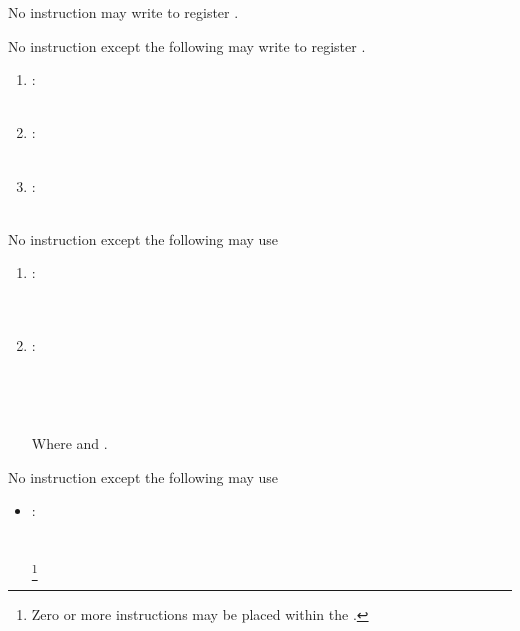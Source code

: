 
\specitem
No instruction may write to register \rbase.

\specitem
No instruction except the following may write to register \rsp.

\begin{enumerate}
    \item
        : \\
         \\
    \item
        : \\
         \\
    \item
        : \\
         \\
\end{enumerate}


\specitem
\label{specitem:x64_jmpq}
No instruction except the following may use 

\begin{enumerate}
    \item
        : \\
         \\
         \\
    \item
        : \\
         \\
         \\
         \\ \\
        Where  and .
\end{enumerate}

\specitem
No instruction except the following may use 

\begin{itemize}
    \item
        : \\
         \\
         \\
        \footnote{Zero or more  instructions may be placed within the .} \\
\end{itemize}


